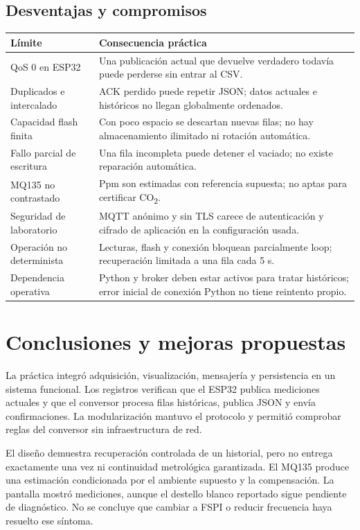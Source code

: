 \documentclass[11pt,a4paper]{article}
\newcommand{\nextsection}[1]{\clearpage\section{#1}}
\begin{document}
\subsection{Desventajas y compromisos}
\begin{table}[h!]
\small
\begin{tabularx}{\linewidth}{@{}P{40mm}Y@{}}
\toprule
\textbf{Límite} & \textbf{Consecuencia práctica}\\\midrule
QoS 0 en ESP32 & Una publicación actual que devuelve verdadero todavía puede perderse sin entrar al CSV.\\
Duplicados e intercalado & ACK perdido puede repetir JSON; datos actuales e históricos no llegan globalmente ordenados.\\
Capacidad flash finita & Con poco espacio se descartan nuevas filas; no hay almacenamiento ilimitado ni rotación automática.\\
Fallo parcial de escritura & Una fila incompleta puede detener el vaciado; no existe reparación automática.\\
MQ135 no contrastado & Ppm son estimadas con referencia supuesta; no aptas para certificar CO\textsubscript{2}.\\
Seguridad de laboratorio & MQTT anónimo y sin TLS carece de autenticación y cifrado de aplicación en la configuración usada.\\
Operación no determinista & Lecturas, flash y conexión bloquean parcialmente loop; recuperación limitada a una fila cada 5 s.\\
Dependencia operativa & Python y broker deben estar activos para tratar históricos; error inicial de conexión Python no tiene reintento propio.\\
\bottomrule
\end{tabularx}
\end{table}

\nextsection{Conclusiones y mejoras propuestas}
La práctica integró adquisición, visualización, mensajería y persistencia en un sistema funcional. Los registros verifican que el ESP32 publica mediciones actuales y que el conversor procesa filas históricas, publica JSON y envía confirmaciones. La modularización mantuvo el protocolo y permitió comprobar reglas del conversor sin infraestructura de red.

El diseño demuestra recuperación controlada de un historial, pero no entrega exactamente una vez ni continuidad metrológica garantizada. El MQ135 produce una estimación condicionada por el ambiente supuesto y la compensación. La pantalla mostró mediciones, aunque el destello blanco reportado sigue pendiente de diagnóstico. No se concluye que cambiar a FSPI o reducir frecuencia haya resuelto ese síntoma.
\end{document}
